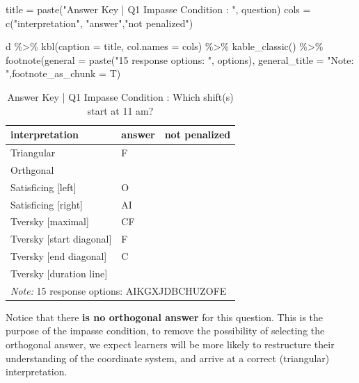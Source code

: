 \documentclass[
  letterpaper,
  DIV=11,
  numbers=noendperiod]{scrreprt}
\newenvironment{Shaded}{\begin{snugshade}}{\end{snugshade}}
\newcommand{\AttributeTok}[1]{\textcolor[rgb]{0.40,0.45,0.13}{#1}}
\newcommand{\FunctionTok}[1]{\textcolor[rgb]{0.28,0.35,0.67}{#1}}
\newcommand{\NormalTok}[1]{\textcolor[rgb]{0.00,0.23,0.31}{#1}}
\newcommand{\OtherTok}[1]{\textcolor[rgb]{0.00,0.23,0.31}{#1}}
\newcommand{\SpecialCharTok}[1]{\textcolor[rgb]{0.37,0.37,0.37}{#1}}
\newcommand{\StringTok}[1]{\textcolor[rgb]{0.13,0.47,0.30}{#1}}
\begin{document}
\begin{Shaded}
\begin{Highlighting}[]
\NormalTok{title }\OtherTok{=} \FunctionTok{paste}\NormalTok{(}\StringTok{"Answer Key | Q1 Impasse Condition : "}\NormalTok{, question)}
\NormalTok{cols }\OtherTok{=} \FunctionTok{c}\NormalTok{(}\StringTok{"interpretation"}\NormalTok{, }\StringTok{"answer"}\NormalTok{,}\StringTok{"not penalized"}\NormalTok{)}

\NormalTok{d }\SpecialCharTok{\%\textgreater{}\%} \FunctionTok{kbl}\NormalTok{(}\AttributeTok{caption =}\NormalTok{ title, }\AttributeTok{col.names =}\NormalTok{ cols) }\SpecialCharTok{\%\textgreater{}\%} \FunctionTok{kable\_classic}\NormalTok{() }\SpecialCharTok{\%\textgreater{}\%} 
  \FunctionTok{footnote}\NormalTok{(}\AttributeTok{general =} \FunctionTok{paste}\NormalTok{(}\StringTok{"15 response options: "}\NormalTok{, options), }\AttributeTok{general\_title =} \StringTok{"Note: "}\NormalTok{,}\AttributeTok{footnote\_as\_chunk =}\NormalTok{ T) }
\end{Highlighting}
\end{Shaded}

\begin{table}

\caption{Answer Key | Q1 Impasse Condition :  Which shift(s) start at 11 am?}
\centering
\begin{tabular}[t]{l|l|l}
\hline
interpretation & answer & not penalized\\
\hline
Triangular & F & \\
\hline
Orthgonal &  & \\
\hline
Satisficing [left] & O & \\
\hline
Satisficing [right] & AI & \\
\hline
Tversky [maximal] & CF & \\
\hline
Tversky [start diagonal] & F & \\
\hline
Tversky [end diagonal] & C & \\
\hline
Tversky [duration line] &  & \\
\hline
\multicolumn{3}{l}{\rule{0pt}{1em}\textit{Note: } 15 response options:  AIKGXJDBCHUZOFE}\\
\end{tabular}
\end{table}

Notice that there \textbf{is no orthogonal answer} for this question.
This is the purpose of the impasse condition, to remove the possibility
of selecting the orthogonal answer, we expect learners will be more
likely to restructure their understanding of the coordinate system, and
arrive at a correct (triangular) interpretation.
\end{document}

